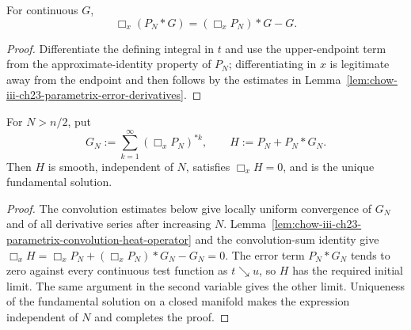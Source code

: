 \begin{lemma}
\label{lem:chow-iii-ch23-parametrix-convolution-heat-operator}


For continuous $G$,
\[
\Box_x(P_N*G)=(\Box_xP_N)*G-G.
\]
\end{lemma}
\begin{proof}
\sketch Differentiate the defining integral in $t$ and use the upper-endpoint term
from the approximate-identity property of $P_N$; differentiating in $x$ is
legitimate away from the endpoint and then follows by the estimates in
Lemma~\ref{lem:chow-iii-ch23-parametrix-error-derivatives}.
\end{proof}

\begin{theorem}
\label{thm:chow-iii-ch23-parametrix-heat-kernel}


For $N>n/2$, put
\[
G_N:=\sum_{k=1}^{\infty}(\Box_xP_N)^{*k},\qquad H:=P_N+P_N*G_N.
\]
Then $H$ is smooth, independent of $N$, satisfies $\Box_xH=0$, and is the
unique fundamental solution.
\end{theorem}
\begin{proof}
\sketch The convolution estimates below give locally uniform convergence of $G_N$ and
of all derivative series after increasing $N$.  Lemma~\ref{lem:chow-iii-ch23-parametrix-convolution-heat-operator} and the convolution-sum identity give
\(\Box_xH=\Box_xP_N+(\Box_xP_N)*G_N-G_N=0\).  The error term
\(P_N*G_N\) tends to zero against every continuous test function as $t\searrow u$,
so $H$ has the required initial limit.  The same argument in the second
variable gives the other limit.  Uniqueness of the fundamental solution on a
closed manifold makes the expression independent of $N$ and completes the
proof.
\end{proof}

